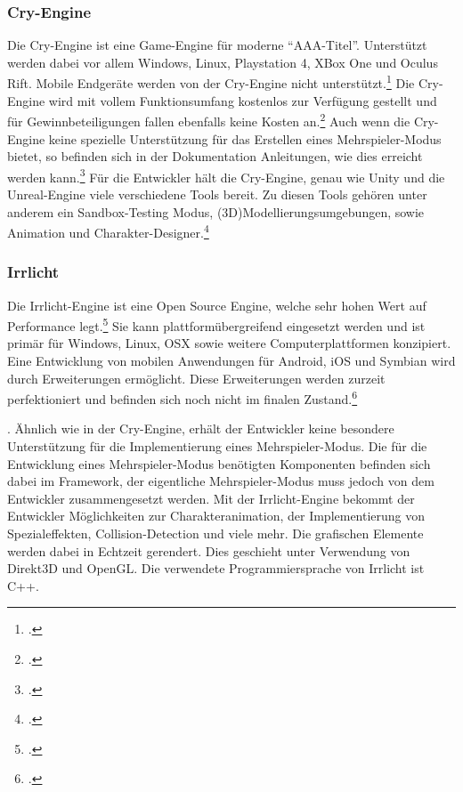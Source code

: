 	\subsubsection*{Cry-Engine}
	Die Cry-Engine ist eine Game-Engine für moderne \enquote{AAA-Titel}. Unterstützt werden dabei vor allem Windows, Linux, Playstation 4, XBox One und Oculus Rift. Mobile Endgeräte werden von der Cry-Engine nicht unterstützt.\footcite[\url{https://www.cryengine.com/features/platforms}]{cry-home} Die Cry-Engine wird mit vollem Funktionsumfang kostenlos zur Verfügung gestellt und für Gewinnbeteiligungen fallen ebenfalls keine Kosten an.\footcite[\url{https://www.cryengine.com/features}]{cry-home} Auch wenn die Cry-Engine keine spezielle Unterstützung für das Erstellen eines Mehrspieler-Modus bietet, so befinden sich in der Dokumentation Anleitungen, wie dies erreicht werden kann.\footcite[\url{http://docs.cryengine.com/display/SDKDOC2/Multiplayer}]{cry-home} Für die Entwickler hält die Cry-Engine, genau wie Unity und die Unreal-Engine viele verschiedene Tools bereit. Zu diesen Tools gehören unter anderem ein Sandbox-Testing Modus, (3D)Modellierungsumgebungen, sowie Animation und Charakter-Designer.\footcite[\url{https://www.cryengine.com/features}]{cry-home}

	\subsubsection*{Irrlicht}
	Die Irrlicht-Engine ist eine Open Source Engine, welche sehr hohen Wert auf Performance legt.\footcite{irrlicht-home} Sie kann plattformübergreifend eingesetzt werden und ist primär für Windows, Linux, OSX sowie weitere Computerplattformen konzipiert. Eine Entwicklung von mobilen Anwendungen für Android, iOS und Symbian wird durch Erweiterungen ermöglicht. Diese Erweiterungen werden zurzeit perfektioniert und befinden sich noch nicht im finalen Zustand.\footcite[\url{http://irrlicht.sourceforge.net/?page\_id=45}]{irrlicht-home}. Ähnlich wie in der Cry-Engine, erhält der Entwickler keine besondere Unterstützung für die Implementierung eines Mehrspieler-Modus. Die für die Entwicklung eines Mehrspieler-Modus benötigten Komponenten befinden sich dabei im Framework, der eigentliche Mehrspieler-Modus muss jedoch von dem Entwickler zusammengesetzt werden.\footnotemark{} Mit der Irrlicht-Engine bekommt der Entwickler Möglichkeiten zur Charakteranimation, der Implementierung von Spezialeffekten, Collision-Detection und viele mehr. Die grafischen Elemente werden dabei in Echtzeit gerendert. Dies geschieht unter Verwendung von Direkt3D und OpenGL. Die verwendete Programmiersprache von Irrlicht ist C++.\footnotemark{}


